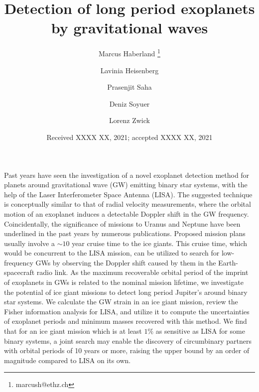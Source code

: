 \documentclass{aa}
\begin{document}
 

  \title{Detection of long period exoplanets by gravitational waves}


  \author{Marcus Haberland
            \fnmsep\thanks{marcush@ethz.ch}
          \and
           Lavinia Heisenberg
           \and
          Prasenjit Saha
           \and
           Deniz Soyuer
          \and
          Lorenz Zwick
          }


  \date{Received XXXX XX, 2021; accepted XXXX XX, 2021}



 
  \abstract
   {Past years have seen the investigation of a novel exoplanet detection method for planets around gravitational wave (GW) emitting binary star systems, with the help of the Laser Interferometer Space Antenna (LISA). The suggested technique is conceptually similar to that of radial velocity measurements, where the orbital motion of an exoplanet induces a detectable Doppler shift in the GW frequency. Coincidentally, the significance of missions to Uranus and Neptune have been underlined in the past years by numerous publications. Proposed mission plans usually involve a $\sim 10$ year cruise time to the ice giants. }
   {This cruise time, which would be concurrent to the LISA mission, can be utilized to search for low-frequency GWs by observing the Doppler shift caused by them in the Earth-spacecraft radio link. As the maximum recoverable orbital period of the imprint of exoplanets in GWs is related to the nominal mission lifetime, we investigate the potential of ice giant missions to detect long period Jupiter’s around binary star systems. }
   {We calculate the GW strain in an ice giant mission, review the Fisher information analysis for LISA, and utilize it to compute the uncertainties of exoplanet periods and minimum masses recovered with this method.}
   {We find that for an ice giant mission which is at least $1\%$ as sensitive as LISA for some binary systems, a joint search may enable the discovery of circumbinary partners with orbital periods of 10 years or more, raising the upper bound by an order of magnitude compared to LISA on its own.}
   {}
\end{document}

